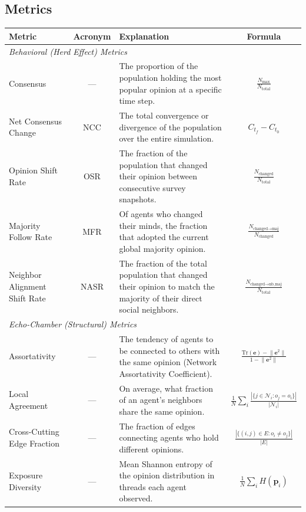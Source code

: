 \documentclass[11pt]{article}
\begin{document}
\subsection{Metrics}

\begin{table}[h]
\centering
\small
\begin{tabular}{|l|c|p{5.8cm}|c|}
\hline
\textbf{Metric} & \textbf{Acronym} & \textbf{Explanation} & \textbf{Formula} \\ \hline
\multicolumn{4}{|l|}{\textit{Behavioral (Herd Effect) Metrics}} \\ \hline
Consensus & --- & The proportion of the population holding the most popular opinion at a specific time step. & $\frac{N_{\max}}{N_{\text{total}}}$ \\ \hline
Net Consensus Change & NCC & The total convergence or divergence of the population over the entire simulation. & $C_{t_f} - C_{t_0}$ \\ \hline
Opinion Shift Rate & OSR & The fraction of the population that changed their opinion between consecutive survey snapshots. & $\frac{N_{\text{changed}}}{N_{\text{total}}}$ \\ \hline
Majority Follow Rate & MFR & Of agents who changed their minds, the fraction that adopted the current global majority opinion. & $\frac{N_{\text{changed} \to \text{maj}}}{N_{\text{changed}}}$ \\ \hline
Neighbor Alignment Shift Rate & NASR & The fraction of the total population that changed their opinion to match the majority of their direct social neighbors. & $\frac{N_{\text{changed} \to \text{nb\_maj}}}{N_{\text{total}}}$ \\ \hline
\multicolumn{4}{|l|}{\textit{Echo-Chamber (Structural) Metrics}} \\ \hline
Assortativity & --- & The tendency of agents to be connected to others with the same opinion (Network Assortativity Coefficient). & $\frac{\text{Tr}(\mathbf{e}) - \lVert \mathbf{e}^2 \rVert}{1 - \lVert \mathbf{e}^2 \rVert}$ \\ \hline
Local Agreement & --- & On average, what fraction of an agent's neighbors share the same opinion. & $\frac{1}{N}\sum_{i}\frac{|\{j \in \mathcal{N}_i : o_j = o_i\}|}{|\mathcal{N}_i|}$ \\ \hline
Cross-Cutting Edge Fraction & --- & The fraction of edges connecting agents who hold different opinions. & $\frac{|\{(i,j) \in E : o_i \neq o_j\}|}{|E|}$ \\ \hline
Exposure Diversity & --- & Mean Shannon entropy of the opinion distribution in threads each agent observed. & $\frac{1}{N}\sum_i H(\mathbf{p}_i)$ \\ \hline

\end{tabular}
\end{table}
\end{document}
